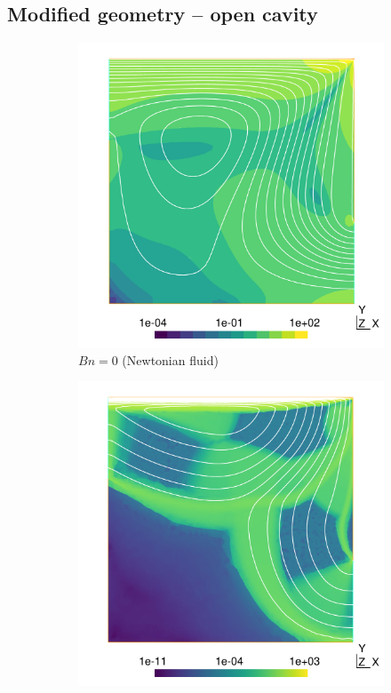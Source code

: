 \documentclass[11 pt]{report}
\begin{document}
\FloatBarrier
\subsection{Modified geometry -- open cavity}
\label{subsec:modifiedCavity}

\begin{figure}[h]
    \centering
    \begin{subfigure}[t]{0.495\textwidth}
        \includegraphics[width=\textwidth]{../figures/opencavity_0.pdf}
        \caption{$Bn=0$ (Newtonian fluid)}
        \label{fig:opencavity0}
    \end{subfigure}
    \begin{subfigure}[t]{0.495\textwidth}
        \includegraphics[width=\textwidth]{../figures/opencavity_100.pdf}

\end{subfigure}
\end{figure}
\end{document}
